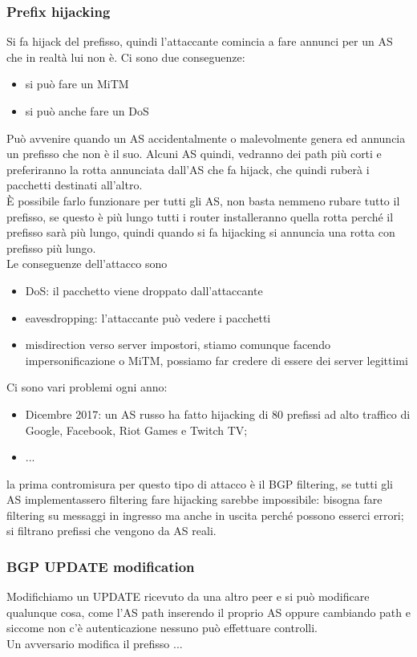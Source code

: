 \documentclass[12pt, oneside]{extbook} %
\begin{document}
\subsubsection{Prefix hijacking}
Si fa hijack del prefisso, quindi l'attaccante comincia a fare annunci per un AS che in realtà lui non è. Ci sono due conseguenze:
\begin{itemize}
\item si può fare un MiTM
\item si può anche fare un DoS
\end{itemize}
Può avvenire quando un AS accidentalmente o malevolmente genera ed annuncia un prefisso che non è il suo. Alcuni AS quindi, vedranno dei path più corti e preferiranno la rotta annunciata dall'AS che fa hijack, che quindi ruberà i pacchetti destinati all'altro.\\È possibile farlo funzionare per tutti gli AS, non basta nemmeno rubare tutto il prefisso, se questo è più lungo tutti i router installeranno quella rotta perché il prefisso sarà più lungo, quindi quando si fa hijacking si annuncia una rotta con prefisso più lungo.\\Le conseguenze dell'attacco sono
\begin{itemize}
\item DoS: il pacchetto viene droppato dall'attaccante
\item eavesdropping: l'attaccante può vedere i pacchetti
\item misdirection verso server impostori, stiamo comunque facendo impersonificazione o MiTM, possiamo far credere di essere dei server legittimi
\end{itemize}
Ci sono vari problemi ogni anno:
\begin{itemize}
\item Dicembre 2017: un AS russo ha fatto hijacking di 80 prefissi ad alto traffico di Google, Facebook, Riot Games e Twitch TV;
\item ...
\end{itemize}
la prima contromisura per questo tipo di attacco è il BGP filtering, se tutti gli AS implementassero filtering fare hijacking sarebbe impossibile: bisogna fare filtering su messaggi in ingresso ma anche in uscita perché possono esserci errori; si filtrano prefissi che vengono da AS reali.
\subsubsection{BGP UPDATE modification}
Modifichiamo un UPDATE ricevuto da una altro peer e si può modificare qualunque cosa, come l'AS path inserendo il proprio AS oppure cambiando path e siccome non c'è autenticazione nessuno può effettuare controlli.\\Un avversario modifica il prefisso ...
\end{document}
